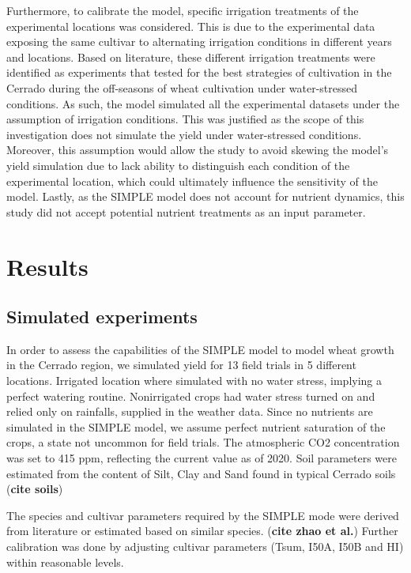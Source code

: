 \documentclass[11pt]{article}
\begin{document}
Furthermore, to calibrate the model, specific irrigation treatments of the experimental locations was considered. This is due to the experimental data exposing the same cultivar to alternating irrigation conditions in different years and locations. Based on literature, these different irrigation treatments were identified as experiments that tested for the best strategies of cultivation in the Cerrado during the off-seasons of wheat cultivation under water-stressed conditions. As such, the model simulated all the experimental datasets under the assumption of irrigation conditions. This was justified as the scope of this investigation does not simulate the yield under water-stressed conditions. Moreover, this assumption would allow the study to avoid skewing the model’s yield simulation due to lack ability to distinguish each condition of the experimental location, which could ultimately influence the sensitivity of the model. Lastly, as the SIMPLE model does not account for nutrient dynamics, this study did not accept potential nutrient treatments as an input parameter.


\section{Results}
\label{sec:org2731a13}
\subsection{Simulated experiments}
\label{sec:org3bac09f}
In order to assess the capabilities of the SIMPLE model to model wheat growth in the Cerrado region, we simulated yield for 13 field trials in 5 different locations. Irrigated location where simulated with no water stress, implying a perfect watering routine. Nonirrigated crops had water stress turned on and relied only on rainfalls, supplied in the weather data. Since no nutrients are simulated in the SIMPLE model, we assume perfect nutrient saturation of the crops, a state not uncommon for field trials. The atmospheric CO2 concentration was set to 415 ppm, reflecting the current value as of 2020. Soil parameters were estimated from the content of Silt, Clay and Sand found in typical Cerrado soils (\textbf{cite soils})

The species and cultivar parameters required by the SIMPLE mode were derived from literature or estimated based on similar species. (\textbf{cite zhao et al.}) Further calibration was done by adjusting cultivar parameters (Tsum, I50A, I50B and HI) within reasonable levels.
\end{document}
